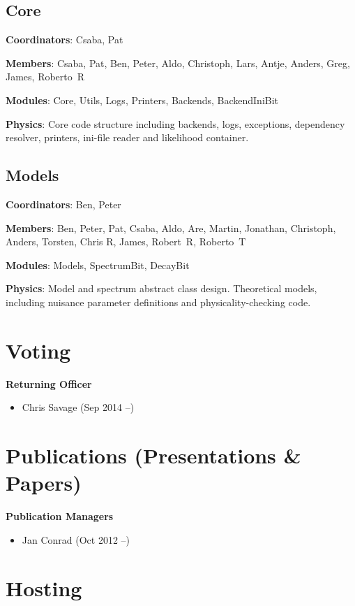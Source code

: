 \subsection{Core}

\textbf{Coordinators}: Csaba, Pat

\textbf{Members}: Csaba, Pat, Ben, Peter, Aldo, Christoph, Lars, Antje, Anders, Greg, James, Roberto~R

\textbf{Modules}: Core, Utils, Logs, Printers, Backends, BackendIniBit

\textbf{Physics}: Core code structure including backends, logs, exceptions, dependency resolver, printers, ini-file reader and likelihood container.


\subsection{Models}

\textbf{Coordinators}: Ben, Peter

\textbf{Members}: Ben, Peter, Pat, Csaba, Aldo, Are, Martin, Jonathan, Christoph, Anders, Torsten, Chris R, James, Robert~R, Roberto~T

\textbf{Modules}: Models, SpectrumBit, DecayBit

\textbf{Physics}: Model and spectrum abstract class design. Theoretical models, including nuisance parameter definitions and physicality-checking code.


\section{Voting}

\textbf{Returning Officer}
\begin{itemize}
\item Chris Savage (Sep 2014 --)
\end{itemize}

\section{Publications (Presentations \& Papers)}

\textbf{Publication Managers}
\begin{itemize}
\item Jan Conrad (Oct 2012 --)
\end{itemize}

\section{Hosting}

